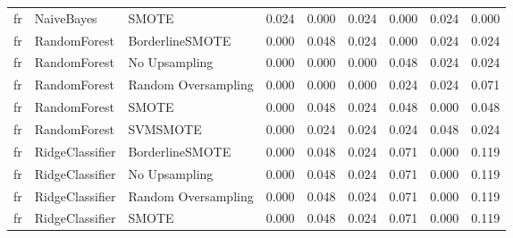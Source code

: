 \begin{tabular}{lllllllll}
      fr &                      NaiveBayes &                         SMOTE &     0.024 &                     0.000 &                 0.024 &                  0.000 &                                   0.024 &     0.000 \\
      fr &                    RandomForest &               BorderlineSMOTE &     0.000 &                     0.048 &                 0.024 &                  0.000 &                                   0.024 &     0.024 \\
      fr &                    RandomForest &                 No Upsampling &     0.000 &                     0.000 &                 0.000 &                  0.048 &                                   0.024 &     0.024 \\
      fr &                    RandomForest &           Random Oversampling &     0.000 &                     0.000 &                 0.000 &                  0.024 &                                   0.024 &     0.071 \\
      fr &                    RandomForest &                         SMOTE &     0.000 &                     0.048 &                 0.024 &                  0.048 &                                   0.000 &     0.048 \\
      fr &                    RandomForest &                      SVMSMOTE &     0.000 &                     0.024 &                 0.024 &                  0.024 &                                   0.048 &     0.024 \\
      fr &                 RidgeClassifier &               BorderlineSMOTE &     0.000 &                     0.048 &                 0.024 &                  0.071 &                                   0.000 &     0.119 \\
      fr &                 RidgeClassifier &                 No Upsampling &     0.000 &                     0.048 &                 0.024 &                  0.071 &                                   0.000 &     0.119 \\
      fr &                 RidgeClassifier &           Random Oversampling &     0.000 &                     0.048 &                 0.024 &                  0.071 &                                   0.000 &     0.119 \\
      fr &                 RidgeClassifier &                         SMOTE &     0.000 &                     0.048 &                 0.024 &                  0.071 &                                   0.000 &     0.119 \\

\end{tabular}
